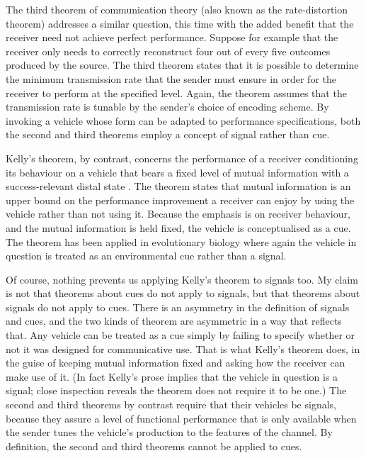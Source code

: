 The third theorem of communication theory (also known as the rate-distortion theorem) addresses a similar question, this time with the added benefit that the receiver need not achieve perfect performance.
Suppose for example that the receiver only needs to correctly reconstruct four out of every five outcomes produced by the source.
The third theorem states that it is possible to determine the minimum transmission rate that the sender must ensure in order for the receiver to perform at the specified level.
Again, the theorem assumes that the transmission rate is tunable by the sender's choice of encoding scheme.
By invoking a vehicle whose form can be adapted to performance specifications, both the second and third theorems employ a concept of signal rather than cue.

Kelly's theorem, by contrast, concerns the performance of a receiver conditioning its behaviour on a vehicle that bears a fixed level of mutual information with a success-relevant distal state \citep{kelly1956new}.
The theorem states that mutual information is an upper bound on the performance improvement a receiver can enjoy by using the vehicle rather than not using it.
Because the emphasis is on receiver behaviour, and the mutual information is held fixed, the vehicle is conceptualised as a cue.
The theorem has been applied in evolutionary biology \citep{donaldson-matasci2010fitness} where again the vehicle in question is treated as an environmental cue rather than a signal.

Of course, nothing prevents us applying Kelly's theorem to signals too.
My claim is not that theorems about cues do not apply to signals, but that theorems about signals do not apply to cues.
There is an asymmetry in the definition of signals and cues, and the two kinds of theorem are asymmetric in a way that reflects that.
Any vehicle can be treated as a cue simply by failing to specify whether or not it was designed for communicative use.
That is what Kelly's theorem does, in the guise of keeping mutual information fixed and asking how the receiver can make use of it.
(In fact Kelly's prose implies that the vehicle in question is a signal; close inspection reveals the theorem does not require it to be one.)
The second and third theorems by contrast require that their vehicles be signals, because they assure a level of functional performance that is only available when the sender tunes the vehicle's production to the features of the channel.
By definition, the second and third theorems cannot be applied to cues.

